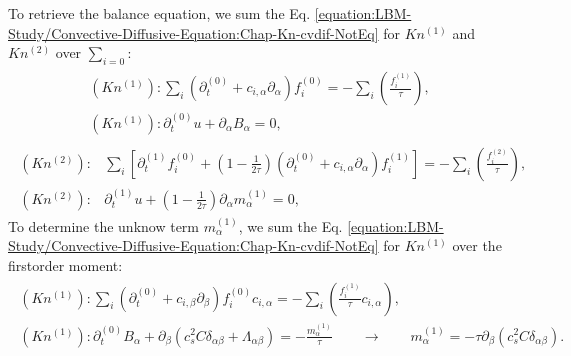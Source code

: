 \documentclass[letterpaper,10pt,english,openany,oneside]{jupyterBook}
\begin{document}
\sphinxAtStartPar
To retrieve the balance equation, we sum the Eq. \eqref{equation:LBM-Study/Convective-Diffusive-Equation:Chap-Kn-cvdif-NotEq} for \(Kn^{(1)}\) and \(Kn^{(2)}\) over \(\sum_{i=0} \):
\begin{equation}\label{equation:LBM-Study/Convective-Diffusive-Equation:cvdif-Kn1-B0-all}
\begin{split}
\begin{array}{l}
(Kn^{(1)}): \displaystyle\sum_{i}\left( \partial_{t}^{(0)} + c_{i,\alpha}\partial_{\alpha} \right)f_{i}^{(0)}= - \displaystyle\sum_{i}\left(\displaystyle\frac{ f_{i}^{(1)} }{ \tau } \right),\\
(Kn^{(1)}): \partial_{t}^{(0)}  u + \partial_{\alpha} B_{\alpha} =0,
\end{array}
\end{split}
\end{equation}\begin{equation}\label{equation:LBM-Study/Convective-Diffusive-Equation:cvdif-Kn2-B0-all}
\begin{split}
\begin{array}{ll}
(Kn^{(2)}):& \displaystyle\sum_{i}\left[ \partial_{t}^{(1)} f_{i}^{(0)} + \displaystyle\left(1 - \frac{1}{2\tau}\right)\left( \partial_{t}^{(0)} + c_{i,\alpha}\partial_{\alpha} \right) f_{i}^{(1)}   \right]=  - \displaystyle\sum_{i}\left(\displaystyle\frac{ f_{i}^{(2)} }{ \tau } \right), \nonumber \\
(Kn^{(2)}):& \partial_{t}^{(1)} u + \displaystyle\left(1 - \frac{1}{2\tau}\right)\partial_{\alpha} m^{(1)}_{\alpha} = 0,
\end{array}
\end{split}
\end{equation}
\sphinxAtStartPar
To determine the unknow term \(m^{(1)}_{\alpha}\), we sum the Eq. \eqref{equation:LBM-Study/Convective-Diffusive-Equation:Chap-Kn-cvdif-NotEq} for \(Kn^{(1)}\) over the first\sphinxhyphen{}order moment:
\begin{equation}\label{equation:LBM-Study/Convective-Diffusive-Equation:cvdif-Kn1-B1-all}
\begin{split}
\begin{array}{l}
(Kn^{(1)}): \displaystyle\sum_{i}\left( \partial_{t}^{(0)} + c_{i,\beta}\partial_{\beta} \right)f_{i}^{(0)}c_{i,\alpha}= - \displaystyle\sum_{i}\left(\displaystyle\frac{ f_{i}^{(1)} }{ \tau } c_{i,\alpha} \right),\\
(Kn^{(1)}): \partial_{t}^{(0)}  B_{\alpha} + \partial_{\beta} \left(c_{s}^{2} C \delta_{\alpha\beta} + \Lambda_{\alpha\beta}\right) = - \displaystyle\frac{m^{(1)}_{\alpha}}{\tau} \quad \quad \rightarrow \quad \quad   m^{(1)}_{\alpha} =-\tau \partial_{\beta} \left(c_{s}^{2} C \delta_{\alpha\beta} \right).
\end{array}
\end{split}
\end{equation}
\end{document}
